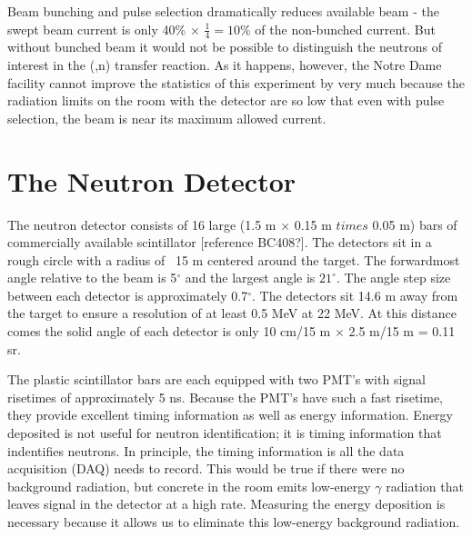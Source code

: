 Beam bunching and pulse selection dramatically reduces available beam - the swept beam current is only 40\% $\times$ $\frac{1}{4} = 10$\% of the non-bunched current.  But without bunched beam it would not be possible to distinguish the neutrons of interest in the (,n) transfer reaction.  As it happens, however, the Notre Dame facility cannot improve the statistics of this experiment by very much because the radiation limits on the room with the detector are so low that even with pulse selection, the beam is near its maximum allowed current.


\section{The Neutron Detector}

The neutron detector consists of 16 large (1.5 m $\times$ 0.15 m $times$ 0.05 m) bars of commercially available scintillator [reference BC408?].  The detectors sit in a rough circle with a radius of ~15 m centered around the target.  The forwardmost angle relative to the beam is 5$^{\circ}$ and the largest angle is $21^{\circ}$.  The angle step size between each detector is approximately 0.7$^{\circ}$.  The detectors sit 14.6 m away from the target to ensure a resolution of at least 0.5 MeV at 22 MeV.  At this distance comes the solid angle of each detector is only 10 cm/15 m $\times$ 2.5 m/15 m = 0.11 sr.


The plastic scintillator bars are each equipped with two PMT's with signal risetimes of approximately 5 ns.  Because the PMT's have such a fast risetime, they provide excellent timing information as well as energy information.  Energy deposited is not useful for neutron identification; it is timing information that indentifies neutrons.  In principle, the timing information is all the data acquisition (DAQ) needs to record.  This would be true if there were no background radiation, but concrete in the room emits low-energy $\gamma$ radiation that leaves signal in the detector at a high rate.  Measuring the energy deposition is necessary because it allows us to eliminate this low-energy background radiation.  

